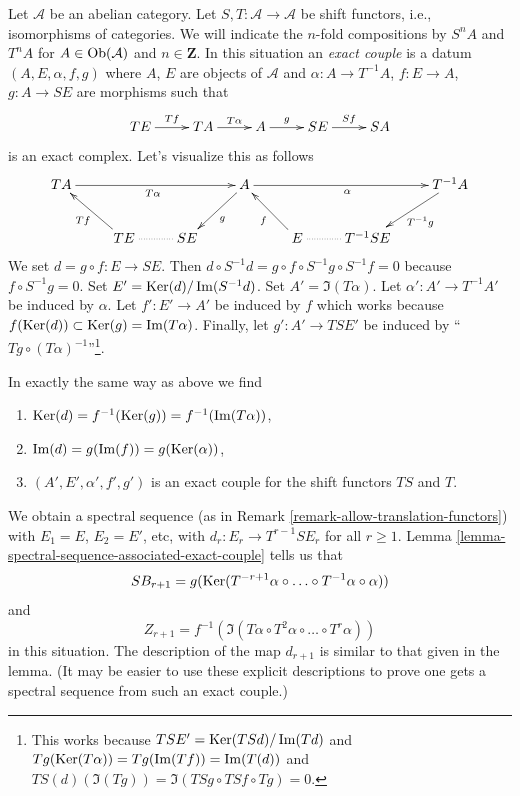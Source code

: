 \begin{remark}[Variant]
\label{remark-shifted-exact-couple}
Let $\mathcal{A}$ be an abelian category. Let
$S, T : \mathcal{A} \to \mathcal{A}$ be shift
functors, i.e., isomorphisms of categories. We will indicate
the $n$-fold compositions by $S^nA$ and $T^nA$ for
$A \in \mathop{\mathrm{Ob}}\nolimits(\mathcal{A})$ and $n \in \mathbf{Z}$.
In this situation an {\it exact couple} is a datum $(A, E, \alpha, f, g)$
where $A$, $E$ are objects of $\mathcal{A}$ and $\alpha : A \to T^{-1}A$,
$f : E \to A$, $g : A \to SE$ are morphisms such that
$$
\xymatrix{
TE \ar[r]^-{Tf} &
TA \ar[r]^-{T\alpha} &
A \ar[r]^-{g} &
SE \ar[r]^{Sf} & SA
}
$$
is an exact complex. Let's visualize this as follows
$$
\xymatrix{
TA \ar[rrr]_{T\alpha} & & &
A \ar[ld]^g \ar[rrr]_\alpha & & &
T^{-1}A \ar[ld]^{T^{-1}g} \\
& TE \ar[lu]^{Tf} \ar@{..}[r] & SE & &
E \ar[lu]^f \ar@{..}[r] & T^{-1}SE
}
$$
We set $d = g \circ f : E \to SE$. Then $d \circ S^{-1}d =
g \circ f \circ S^{-1}g \circ S^{-1}f = 0$ because $f \circ S^{-1}g = 0$.
Set $E' = \mathop{\mathrm{Ker}}(d)/\mathop{\mathrm{Im}}(S^{-1}d)$. Set $A' = \Im(T\alpha)$.
Let $\alpha' : A' \to T^{-1}A'$ be induced by $\alpha$.
Let $f' : E' \to A'$ be induced by $f$ which works because
$f(\mathop{\mathrm{Ker}}(d)) \subset \mathop{\mathrm{Ker}}(g) = \mathop{\mathrm{Im}}(T\alpha)$.
Finally, let $g' : A' \to TSE'$ be induced by
``$Tg \circ (T\alpha)^{-1}$''\footnote{This works because
$TSE' = \mathop{\mathrm{Ker}}(TSd)/\mathop{\mathrm{Im}}(Td)$ and
$Tg(\mathop{\mathrm{Ker}}(T\alpha)) = Tg(\mathop{\mathrm{Im}}(Tf)) = \mathop{\mathrm{Im}}(T(d))$
and $TS(d)(\Im(Tg)) = \Im(TSg \circ TSf \circ Tg) = 0$.}.

\medskip\noindent
In exactly the same way as above we find
\begin{enumerate}
\item $\mathop{\mathrm{Ker}}(d) = f^{-1}(\mathop{\mathrm{Ker}}(g)) = f^{-1}(\mathop{\mathrm{Im}}(T\alpha))$,
\item $\mathop{\mathrm{Im}}(d) = g(\mathop{\mathrm{Im}}(f)) = g(\mathop{\mathrm{Ker}}(\alpha))$,
\item $(A', E', \alpha', f', g')$ is an exact couple
for the shift functors $TS$ and $T$.
\end{enumerate}
We obtain a spectral sequence
(as in Remark \ref{remark-allow-translation-functors})
with $E_1 = E$, $E_2 = E'$, etc, with $d_r : E_r \to T^{r - 1}SE_r$
for all $r \geq 1$. Lemma \ref{lemma-spectral-sequence-associated-exact-couple}
tells us that
$$
SB_{r + 1} =
g(\mathop{\mathrm{Ker}}(T^{-r + 1}\alpha \circ \ldots \circ T^{-1}\alpha \circ \alpha))
$$
and
$$
Z_{r + 1} = f^{-1}(\Im(T\alpha \circ T^2\alpha \circ \ldots \circ T^r\alpha))
$$
in this situation. The description of the map $d_{r + 1}$ is similar
to that given in the lemma. (It may be easier to use these explicit
descriptions to prove one gets a spectral sequence from such an exact
couple.)
\end{remark}






